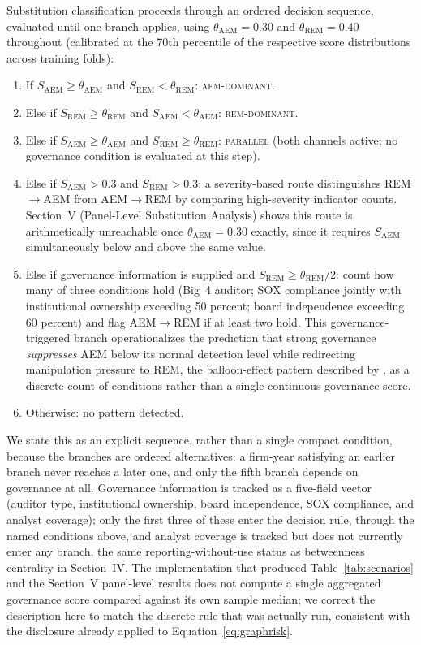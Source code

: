 \documentclass[12pt]{article}
\begin{document}
Substitution classification proceeds through an ordered decision
sequence, evaluated until one branch applies, using
$\theta_{\text{AEM}} = 0.30$ and $\theta_{\text{REM}} = 0.40$ throughout
(calibrated at the 70th percentile of the respective score
distributions across training folds):
\begin{enumerate}
    \item If $S_{\text{AEM}} \geq \theta_{\text{AEM}}$ and $S_{\text{REM}} < \theta_{\text{REM}}$: \textsc{aem-dominant}.
    \item Else if $S_{\text{REM}} \geq \theta_{\text{REM}}$ and $S_{\text{AEM}} < \theta_{\text{AEM}}$: \textsc{rem-dominant}.
    \item Else if $S_{\text{AEM}} \geq \theta_{\text{AEM}}$ and $S_{\text{REM}} \geq \theta_{\text{REM}}$: \textsc{parallel} (both channels active; no governance condition is evaluated at this step).
    \item Else if $S_{\text{AEM}} > 0.3$ and $S_{\text{REM}} > 0.3$: a severity-based route distinguishes REM$\to$AEM from AEM$\to$REM by comparing high-severity indicator counts.  Section~V (Panel-Level Substitution Analysis) shows this route is arithmetically unreachable once $\theta_{\text{AEM}} = 0.30$ exactly, since it requires $S_{\text{AEM}}$ simultaneously below and above the same value.
    \item Else if governance information is supplied and $S_{\text{REM}} \geq \theta_{\text{REM}}/2$: count how many of three conditions hold (Big~4 auditor; SOX compliance jointly with institutional ownership exceeding 50 percent; board independence exceeding 60 percent) and flag AEM$\to$REM if at least two hold.  This governance-triggered branch operationalizes the prediction that strong governance \emph{suppresses} AEM below its normal detection level while redirecting manipulation pressure to REM, the balloon-effect pattern described by \citeauthor{zang2012} \citeyearpar{zang2012}, as a discrete count of conditions rather than a single continuous governance score.
    \item Otherwise: no pattern detected.
\end{enumerate}
\label{eq:classrule}

We state this as an explicit sequence, rather than a single compact
condition, because the branches are ordered alternatives: a firm-year
satisfying an earlier branch never reaches a later one, and only the
fifth branch depends on governance at all.  Governance information is
tracked as a five-field vector (auditor type, institutional ownership,
board independence, SOX compliance, and analyst coverage); only the
first three of these enter the decision rule, through the named
conditions above, and analyst coverage is tracked but does not
currently enter any branch, the same reporting-without-use status as
betweenness centrality in Section~IV.  The implementation that
produced Table~\ref{tab:scenarios} and the Section~V panel-level
results does not compute a single aggregated governance score compared
against its own sample median; we correct the description here to
match the discrete rule that was actually run, consistent with the
disclosure already applied to Equation~\eqref{eq:graphrisk}.
\end{document}
